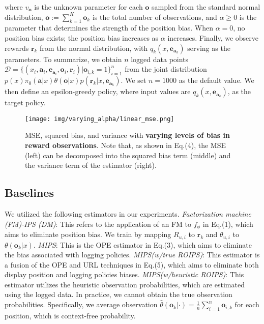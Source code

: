 \documentclass[a4paper,10pt]{article} %
\begin{document}
\begin{multicols}{2}
where \( v_{\boldsymbol{o}} \) is the unknown parameter for each \( \boldsymbol{o} \) sampled from the standard normal distribution, \( \bar{\boldsymbol{o}} := \sum_{k=1}^{K} \boldsymbol{o}_k \) is the total number of observations, and \( \alpha \geq 0 \) is the parameter that determines the strength of the position bias. When \( \alpha = 0 \), no position bias exists; the position bias increases as \( \alpha \) increases. Finally, we observe rewards \( \boldsymbol{r}_k \) from the normal distribution, with \( q_{k}(x,\boldsymbol{e}_{\boldsymbol{a}_k}) \) serving as the parameters. To summarize, we obtain \( n \) logged data points \( \mathcal{D} = \{ (x_i, \boldsymbol{a}_i, \boldsymbol{e}_{\boldsymbol{a}_i}, \boldsymbol{o}_i, \boldsymbol{r}_i) | \boldsymbol{o}_{i,k} = 1 \}_{i=1}^{n} \) from the joint distribution \( p(x)\pi_{0}(\boldsymbol{a}|x)\theta(\boldsymbol{o}|x)p(\boldsymbol{r}_k|x,\boldsymbol{e}_{\boldsymbol{a}_k}) \). We set \( n = 1000 \) as the default value. We then define an epsilon-greedy policy, where input values are \( q_{k}(x,\boldsymbol{e}_{\boldsymbol{a}_k}) \), as the target policy.

\begin{figure*}[ht]
    \centering
    \texttt{[image: img/varying\_alpha/linear\_mse.png]}
    \vspace{-5mm}
    \caption{MSE, squared bias, and variance with \textbf{varying levels of bias in reward observations}. Note that, as shown in Eq.(4), the MSE (left) can be decomposed into the squared bias term (middle) and the variance term of the estimator (right).}
    \label{fig:images}
\end{figure*}

\subsection{Baselines} We utilized the following estimators in our experiments. \textit{Factorization machine (FM)-IPS (DM)}: This refers to the application of an FM to \( f_{\phi} \) in Eq.(1), which aims to eliminate position bias. We train by mapping \( R_{u,i} \) to \( \boldsymbol{r}_k \) and \( \theta_{u,i} \) to \( \theta(\boldsymbol{o}_k|x) \). \textit{MIPS}: This is the OPE estimator in Eq.(3), which aims to eliminate the bias associated with logging policies. \textit{MIPS(w/true ROIPS)}: This estimator is a fusion of the OPE and URL techniques in Eq.(5), which aims to eliminate both display position and logging policies biases. \textit{MIPS(w/heuristic ROIPS)}: This estimator utilizes the heuristic observation probabilities, which are estimated using the logged data. In practice, we cannot obtain the true observation probabilities. Specifically, we average observation \( \hat{\theta}(\boldsymbol{o}_k|\cdot) = \frac{1}{n} \sum_{i=1}^{n} \boldsymbol{o}_{i,k} \) for each position, which is context-free probability.


\end{multicols}
\end{document}
